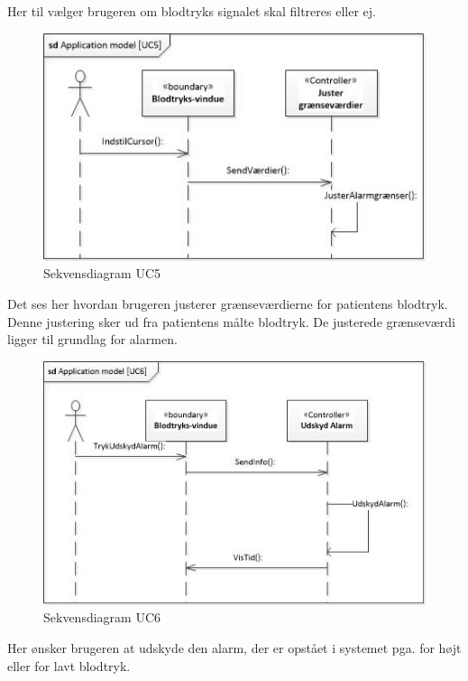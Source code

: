 Her til vælger brugeren om blodtryks signalet skal filtreres eller ej.

\begin{figure}[H]
	\includegraphics[width=1\textwidth]{Figurer/ISE/sdAppModelUC5}
	\caption{Sekvensdiagram UC5}
	\label{sd UC5}
\end{figure}

Det ses her hvordan brugeren justerer grænseværdierne for patientens blodtryk. Denne justering sker ud fra patientens målte blodtryk. De justerede grænseværdi ligger til grundlag for alarmen. 

\begin{figure}[H]
	\includegraphics[width=1\textwidth]{Figurer/ISE/sdAppModelUC6}
	\caption{Sekvensdiagram UC6}
	\label{sd UC6}
\end{figure}

Her ønsker brugeren at udskyde den alarm, der er opstået i systemet pga. for højt eller for lavt blodtryk.

